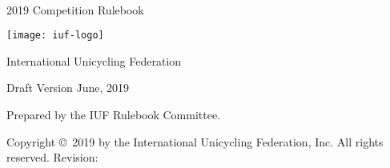 \begin{titlepage}
\centering
\ \\
\vspace{5cm}
{\Huge 2019 Competition Rulebook}
\vspace{5mm}

\texttt{[image: iuf-logo]}

\vspace{5mm}
{\huge International Unicycling Federation}

\vspace{5mm}
{\Large Draft Version \quad June, 2019}

\vspace{45mm}
Prepared by the IUF Rulebook Committee.

\vspace{5mm}
{\small Copyright \copyright\ 2019 by the International Unicycling Federation, Inc. All rights reserved.}
\small{Revision: \href{https://github.com/iuf/rulebook/commit/\gitHash}{\gitAbbrevHash} \ \gitCommitterDate}

\end{titlepage}
